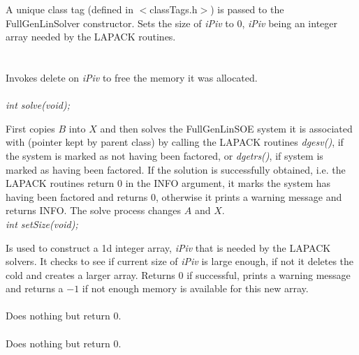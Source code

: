 A unique class tag (defined in $<$classTags.h$>$) is passed to the
FullGenLinSolver constructor. Sets the size of {\em iPiv} to $0$, {\em
iPiv} being an integer array needed by the LAPACK routines. \\

 \\
\\ 
Invokes delete on {\em iPiv} to free the memory it was allocated. \\


  \\
{\em int solve(void);} 

First copies $B$ into $X$ and then solves the FullGenLinSOE system 
it is associated with (pointer kept by parent class) by calling the LAPACK 
routines {\em dgesv()}, if the system is marked as not having been factored,
or {\em dgetrs()}, if system is marked as having been factored. If the
solution is successfully obtained, i.e. the LAPACK routines return $0$
in the INFO argument, it marks the system has having been
factored and returns $0$, otherwise it prints a warning message and
returns INFO. The solve process changes $A$ and $X$. \\   

{\em int setSize(void);} 

Is used to construct a 1d integer array, {\em iPiv} that is needed by
the LAPACK solvers. It checks to see if current size of {\em iPiv} is
large enough, if not it deletes the cold and creates a larger
array. Returns $0$ if successful, prints a warning message and returns
a $-1$ if not enough memory is available for this new array. \\


 \\ 
Does nothing but return $0$. \\

 \\ 
Does nothing but return $0$. \\




